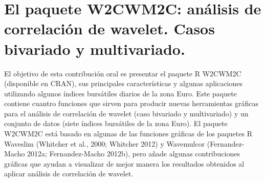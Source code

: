 \chapter{El paquete W2CWM2C: análisis de correlación de wavelet. Casos  bivariado y multivariado. }




El objetivo de esta contribución oral es presentar el paquete R 
W2CWM2C (disponible en CRAN), sus principales características y 
algunas aplicaciones utilizando algunos índices bursátiles diarios
de la zona Euro. Este paquete contiene cuantro funciones que sirven 
para producir nuevas herramientas gráficas para el análisis de 
correlación de wavelet (caso bivariado y multivariado) y un conjunto 
de datos (siete índices bursátiles de la zona Euro). El paquete 
W2CWM2C está basado en algunas de las funciones gráficas de los 
paquetes R Waveslim (Whitcher et al., 2000; Whitcher 2012) y 
Wavemulcor (Fernandez-Macho 2012a; Fernandez-Macho 2012b), pero 
añade algunas contribuciones gráficas que ayudan a visualizar de mejor 
manera los resultados obtenidos al aplicar análisis de correlación de wavelet. 

%

%
